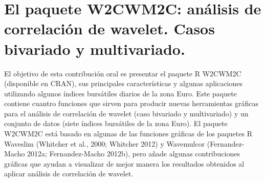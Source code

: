 \chapter{El paquete W2CWM2C: análisis de correlación de wavelet. Casos  bivariado y multivariado. }




El objetivo de esta contribución oral es presentar el paquete R 
W2CWM2C (disponible en CRAN), sus principales características y 
algunas aplicaciones utilizando algunos índices bursátiles diarios
de la zona Euro. Este paquete contiene cuantro funciones que sirven 
para producir nuevas herramientas gráficas para el análisis de 
correlación de wavelet (caso bivariado y multivariado) y un conjunto 
de datos (siete índices bursátiles de la zona Euro). El paquete 
W2CWM2C está basado en algunas de las funciones gráficas de los 
paquetes R Waveslim (Whitcher et al., 2000; Whitcher 2012) y 
Wavemulcor (Fernandez-Macho 2012a; Fernandez-Macho 2012b), pero 
añade algunas contribuciones gráficas que ayudan a visualizar de mejor 
manera los resultados obtenidos al aplicar análisis de correlación de wavelet. 

%

%
